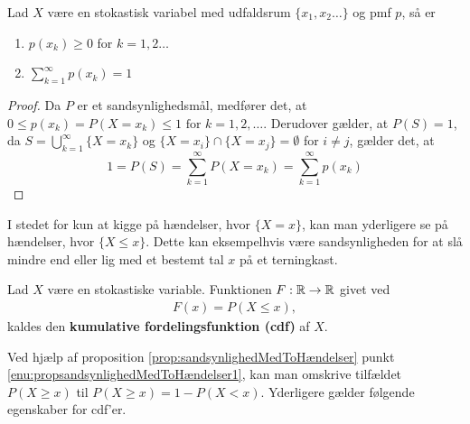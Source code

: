 
\begin{prop}\label{prop:kravTilPMF}\label{prop:pmfEgenskaber} %
Lad $X$ være en stokastisk variabel med udfaldsrum $\{x_1, x_2\ldots\}$ og pmf $p$, så er 
\begin{enumerate}
    \item $p(x_k) \geq 0$ for $k=1,2 \ldots$
    \item $\displaystyle \sum_{k=1}^{\infty} p(x_k) = 1 $
\end{enumerate}
\end{prop}
\begin{proof}
Da $P$ er et sandsynlighedsmål, medfører det, at $0 \leq p(x_k) = P(X = x_k) \leq 1 \text{ for } k=1,2,\ldots$. Derudover gælder, at $P(S)=1$, da $S = \bigcup^\infty_{k = 1} \{X=x_k\}$ og $\{X=x_i\} \cap \{X=x_j\} = \emptyset$ for $i \neq j$, gælder det, at
\begin{equation*}
    1 = P(S) = \sum^\infty_{k = 1} P(X=x_k) = \sum_{k=1}^\infty p(x_k)
\end{equation*}
\end{proof}
I stedet for kun at kigge på hændelser, hvor $\{ X=x \}$, kan man yderligere se på hændelser, hvor $\{X \leq x \}$. Dette kan eksempelhvis være sandsynligheden for at slå mindre end eller lig med et bestemt tal $x$ på et terningkast. 
\begin{defn} %
Lad $X$ være en stokastiske variable. Funktionen $F: \mathbb{R} \to \mathbb{R}$ givet ved
\begin{align*}
    F(x)=P(X\leq x), 
\end{align*}
kaldes den \textbf{kumulative fordelingsfunktion (cdf)} af $X$.
\end{defn}

Ved hjælp af proposition \ref{prop:sandsynlighedMedToHændelser} punkt \ref{enu:propsandsynlighedMedToHændelser1}, kan man omskrive tilfældet $P(X\geq x)$ til $P(X\geq x)=1-P(X<x)$. Yderligere gælder følgende egenskaber for cdf'er. 

